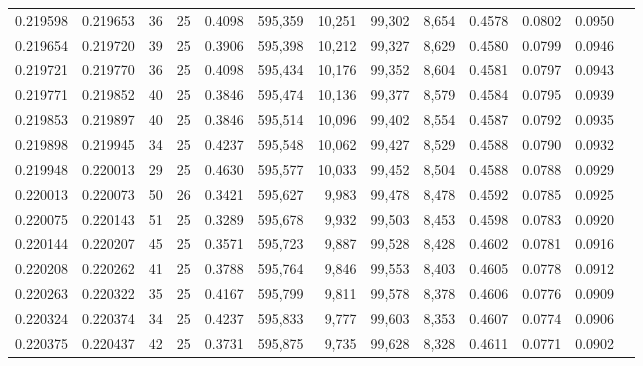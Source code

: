 \begin{tabular}{rrrrrrrrrrrrr}
0.219598 & 0.219653 &  36 &  25 &                                     0.4098 & 595,359 &  10,251 &  99,302 &   8,654 & 0.4578 & 0.0802 & 0.0950 \\
0.219654 & 0.219720 &  39 &  25 &                                     0.3906 & 595,398 &  10,212 &  99,327 &   8,629 & 0.4580 & 0.0799 & 0.0946 \\
0.219721 & 0.219770 &  36 &  25 &                                     0.4098 & 595,434 &  10,176 &  99,352 &   8,604 & 0.4581 & 0.0797 & 0.0943 \\
0.219771 & 0.219852 &  40 &  25 &                                     0.3846 & 595,474 &  10,136 &  99,377 &   8,579 & 0.4584 & 0.0795 & 0.0939 \\
0.219853 & 0.219897 &  40 &  25 &                                     0.3846 & 595,514 &  10,096 &  99,402 &   8,554 & 0.4587 & 0.0792 & 0.0935 \\
0.219898 & 0.219945 &  34 &  25 &                                     0.4237 & 595,548 &  10,062 &  99,427 &   8,529 & 0.4588 & 0.0790 & 0.0932 \\
0.219948 & 0.220013 &  29 &  25 &                                     0.4630 & 595,577 &  10,033 &  99,452 &   8,504 & 0.4588 & 0.0788 & 0.0929 \\
0.220013 & 0.220073 &  50 &  26 &                                     0.3421 & 595,627 &   9,983 &  99,478 &   8,478 & 0.4592 & 0.0785 & 0.0925 \\
0.220075 & 0.220143 &  51 &  25 &                                     0.3289 & 595,678 &   9,932 &  99,503 &   8,453 & 0.4598 & 0.0783 & 0.0920 \\
0.220144 & 0.220207 &  45 &  25 &                                     0.3571 & 595,723 &   9,887 &  99,528 &   8,428 & 0.4602 & 0.0781 & 0.0916 \\
0.220208 & 0.220262 &  41 &  25 &                                     0.3788 & 595,764 &   9,846 &  99,553 &   8,403 & 0.4605 & 0.0778 & 0.0912 \\
0.220263 & 0.220322 &  35 &  25 &                                     0.4167 & 595,799 &   9,811 &  99,578 &   8,378 & 0.4606 & 0.0776 & 0.0909 \\
0.220324 & 0.220374 &  34 &  25 &                                     0.4237 & 595,833 &   9,777 &  99,603 &   8,353 & 0.4607 & 0.0774 & 0.0906 \\
0.220375 & 0.220437 &  42 &  25 &                                     0.3731 & 595,875 &   9,735 &  99,628 &   8,328 & 0.4611 & 0.0771 & 0.0902 \\

\end{tabular}
